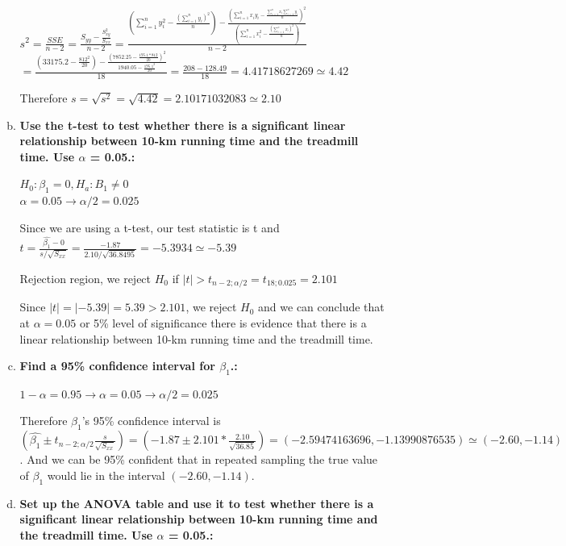 \documentclass{article}
\begin{document}
\begin{enumerate}[1.]
\begin{enumerate}[(a)]
\begingroup
\Large
$s^2 = \frac{SSE}{n-2} = \frac{S_{yy} - \frac{S_{xy}^2}{S_{xx}}}{n-2} = \frac{            (\sum_{i=1}^{n}{y_i^2} - \frac{ (\sum_{i=1}^{n}{y_i})^2}{n} )  - 
\frac{   ( \sum_{i=1}^{n}{x_iy_i }  - \frac{  \sum_{i=1}^{n}{x_i}  \sum_{i=1}^{n}{y_i}  }{n})^2     }
{    (\sum_{i=1}^{n}{x_i^2} - \frac{ (\sum_{i=1}^{n}{x_i})^2}{n} )     }}
{n - 2}$ \\
$ = \frac{ (33175.2 - \frac{812^2}{20}) - \frac{ (7852.25 - \frac{195.1 * 812}{20})^2}{1940.05-\frac{195.1^2}{20}}  }{18} = \frac{208 - 128.49}{18} = 4.41718627269 \simeq 4.42 $
\endgroup

Therefore $s = \sqrt{s^2} = \sqrt{4.42} = 2.10171032083 \simeq 2.10$

  \item \textbf{Use the t-test to test whether there is a significant linear relationship between 10-km
running time and the treadmill time. Use $\alpha$ = 0.05.: }

$H_0: \beta_1 = 0, H_a: B_1 \neq 0$ \\
$\alpha = 0.05 \to \alpha/2 = 0.025$

Since we are using a t-test, our test statistic is t and $t= \frac{\hat{\beta_1} - 0}{s/\sqrt{S_{xx}}} = \frac{-1.87}{2.10/\sqrt{36.8495}} = -5.3934 \simeq -5.39$

Rejection region, we reject $H_0$ if $|t| > t_{n-2;\alpha/2} = t_{18;0.025} = 2.101$

Since $|t| = |-5.39| = 5.39 > 2.101$, we reject $H_0$ and we can conclude that at $\alpha = 0.05$ or 5\% level of significance there is evidence that there is a linear relationship between 10-km running time and the treadmill time.

  \item \textbf{ Find a 95\% confidence interval for $\beta_1$.: }

$1 - \alpha = 0.95 \to \alpha = 0.05 \to \alpha/2 = 0.025$

Therefore $\beta_1$'s 95\% confidence interval is \\ 
$(\hat{\beta_1} \pm t_{n-2;\alpha/2}\frac{s}{\sqrt{S_{xx}}}) = (-1.87 \pm 2.101 * \frac{2.10}{\sqrt{36.85}}) = (-2.59474163696, -1.13990876535) \simeq (-2.60, -1.14) $. And we can be 95\% confident that in repeated sampling the true value of $\beta_1$ would lie in the interval $(-2.60, -1.14)$.

  \item \textbf{ Set up the ANOVA table and use it to test whether there is a significant linear relationship between 10-km running time and the treadmill time. Use $\alpha$ = 0.05.: }


\end{enumerate}
\end{enumerate}
\end{document}
